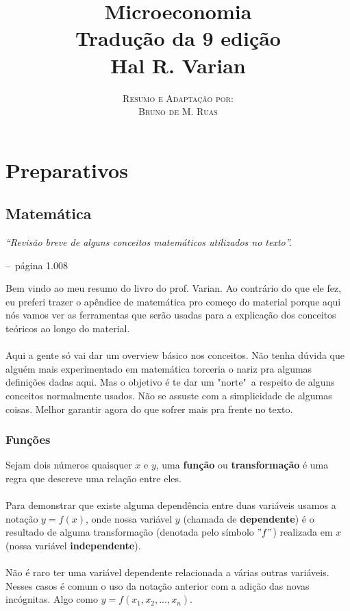 \documentclass[a4paper,11pt,oneside]{book}
\title{\Huge \textbf{Microeconomia} \\ 
\Large Tradução da 9 edição \\
\huge Hal R. Varian}
\author{
\textsc{Resumo e Adaptação por:} \\
\textsc{Bruno de M. Ruas}
}
\makeatletter
\theoremstyle{definition}
\theoremstyle{break}
\newenvironment{chapquote}[2][2em]
  {\setlength{\@tempdima}{#1}%
   \def\chapquote@author{#2}%
   \parshape 1 \@tempdima \dimexpr\textwidth-2\@tempdima\relax%
   \itshape}
  {\par\normalfont\hfill--\ \chapquote@author\hspace*{\@tempdima}\par\bigskip}
\makeatother
\begin{document}
\frontmatter
\maketitle

\tableofcontents

\mainmatter

\part{Preparativos}

\chapter{Matemática}

\begin{chapquote}{página 1.008}
	``Revisão breve de alguns conceitos matemáticos utilizados no texto''.
\end{chapquote}

Bem vindo ao meu resumo do livro do prof. Varian. Ao contrário do que ele fez, eu preferi trazer o apêndice de matemática pro começo do material porque aqui nós vamos ver as ferramentas que serão usadas para a explicação dos conceitos teóricos ao longo do material.
\\
\\
Aqui a gente só vai dar um overview básico nos conceitos. Não tenha dúvida que alguém mais experimentado em matemática torceria o nariz pra algumas definições dadas aqui. Mas o objetivo é te dar um "norte"\ a respeito de alguns conceitos normalmente usados. Não se assuste com a simplicidade de algumas coisas. Melhor garantir agora do que sofrer mais pra frente no texto.

\section{Funções}

Sejam dois números quaisquer $x$ e $y$, uma \textbf{função} ou \textbf{transformação} é uma regra que descreve uma relação entre eles.
\\
\\
Para demonstrar que existe alguma dependência entre duas variáveis usamos a notação $y = f(x)$, onde nossa variável $y$ (chamada de \textbf{dependente}) é o resultado de alguma transformação (denotada pelo símbolo $"f"$) realizada em $x$ (nossa variável \textbf{independente}).
\\
\\
Não é raro ter uma variável dependente relacionada a várias outras variáveis. Nesses casos é comum o uso da notação anterior com a adição das novas incógnitas. Algo como $y = f(x_1,x_2,...,x_n)$.
\end{document}
